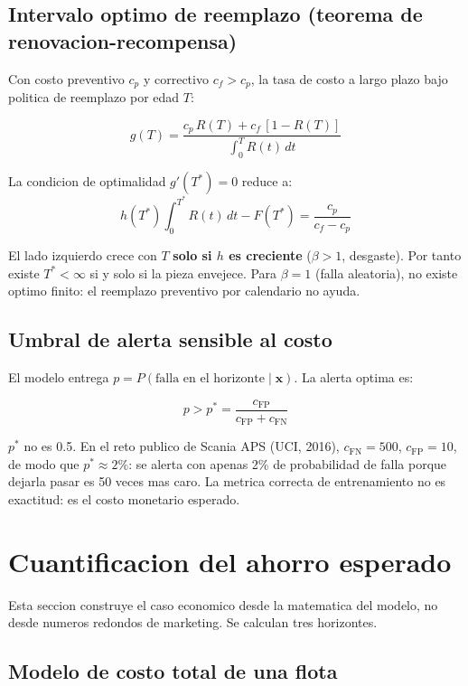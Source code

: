 \documentclass[10.5pt,a4paper]{article}
\begin{document}
\subsection{Intervalo optimo de reemplazo (teorema de renovacion-recompensa)}

Con costo preventivo $c_p$ y correctivo $c_f > c_p$, la tasa de costo a largo
plazo bajo politica de reemplazo por edad $T$:

\begin{mathbox}
$$g(T) = \frac{c_p\,R(T) + c_f\,[1-R(T)]}{\displaystyle\int_0^T R(t)\,dt}$$

La condicion de optimalidad $g'(T^*)=0$ reduce a:
$$h(T^*)\int_0^{T^*} R(t)\,dt - F(T^*) = \frac{c_p}{c_f - c_p}$$

El lado izquierdo crece con $T$ \textbf{solo si $h$ es creciente} ($\beta>1$,
desgaste). Por tanto existe $T^*<\infty$ si y solo si la pieza envejece.
Para $\beta=1$ (falla aleatoria), no existe optimo finito: el reemplazo
preventivo por calendario no ayuda.
\end{mathbox}

\subsection{Umbral de alerta sensible al costo}

El modelo entrega $p = P(\text{falla en el horizonte}\mid\mathbf{x})$.
La alerta optima es:

\begin{mathbox}
$$p > p^* = \frac{c_{\mathrm{FP}}}{c_{\mathrm{FP}} + c_{\mathrm{FN}}}$$

$p^*$ no es 0.5. En el reto publico de Scania APS (UCI, 2016),
$c_{\mathrm{FN}} = 500$, $c_{\mathrm{FP}} = 10$, de modo que $p^* \approx 2\%$:
se alerta con apenas 2\% de probabilidad de falla porque dejarla pasar
es 50 veces mas caro. La metrica correcta de entrenamiento no es exactitud:
es el costo monetario esperado.
\end{mathbox}

\section{Cuantificacion del ahorro esperado}

Esta seccion construye el caso economico desde la matematica del modelo, no
desde numeros redondos de marketing. Se calculan tres horizontes.

\subsection{Modelo de costo total de una flota}
\end{document}
